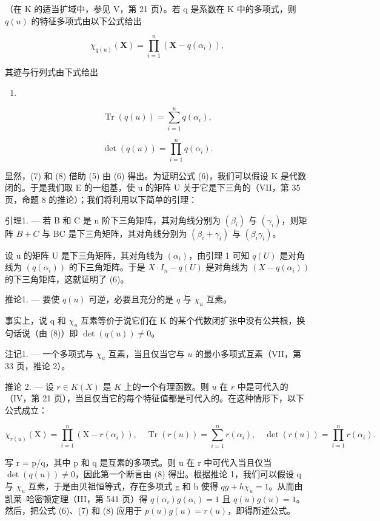 （在 K 的适当扩域中，参见 V，第 21 页）。若 q 是系数在 K 中的多项式，则 \(q(u)\) 的特征多项式由以下公式给出

\[
\chi_ {q (u)} (\mathbf {X}) = \prod_ {i = 1} ^ {n} \left(\mathbf {X} - q \left(\alpha_ {i}\right)\right),\tag{6}
\]

其迹与行列式由下式给出

\begin{enumerate}
\def\labelenumi{(\arabic{enumi})}
\setcounter{enumi}{6}
\tightlist
\item
\end{enumerate}

\[
\operatorname{Tr} (q (u)) = \sum_ {i = 1} ^ {n} q (\alpha_ {i}),\tag{8}
\]

\[
\det (q (u)) = \prod_ {i = 1} ^ {n} q (\alpha_ {i}).
\]

显然，(7) 和 (8) 借助 (5) 由 (6) 得出。为证明公式 (6)，我们可以假设 K 是代数闭的。于是我们取 E 的一组基，使 u 的矩阵 U 关于它是下三角的（VII，第 35 页，命题 8 的推论）；我们将利用以下简单的引理：

引理1. --- 若 B 和 C 是 n 阶下三角矩阵，其对角线分别为 \((\beta_{i})\) 与 \((\gamma_{i})\)，则矩阵 \(B + C\) 与 BC 是下三角矩阵，其对角线分别为 \((\beta_{i} + \gamma_{i})\) 与 \((\beta_{i}\gamma_{i})\)。

设 u 的矩阵 U 是下三角矩阵，其对角线为 \((\alpha_{i})\)，由引理 1 可知 \(q(U)\) 是对角线为 \((q(\alpha_{i}))\) 的下三角矩阵。于是 \(X \cdot I_{n} - q(U)\) 是对角线为 \((X - q(\alpha_{i}))\) 的下三角矩阵，这就证明了 (6)。

推论1. --- 要使 \(q(u)\) 可逆，必要且充分的是 \(q\) 与 \(\chi_u\) 互素。

事实上，说 q 和 \(\chi_{u}\) 互素等价于说它们在 K 的某个代数闭扩张中没有公共根，换句话说（由 (8)）即 \(\det(q(u)) \neq 0\)。

注记1. --- 一个多项式与 \(\chi_{u}\) 互素，当且仅当它与 \(u\) 的最小多项式互素（VII，第 33 页，推论 2）。

推论 2. --- 设 \(r \in K(X)\) 是 \(K\) 上的一个有理函数。则 \(u\) 在 \(r\) 中是可代入的（IV，第 21 页），当且仅当它的每个特征值都是可代入的。在这种情形下，以下公式成立：

\[
\chi_ {r (u)} (\mathrm{X}) = \prod_ {i = 1} ^ {n} \left(\mathrm{X} - r \left(\alpha_ {i}\right)\right), \quad \operatorname{Tr} (r (u)) = \sum_ {i = 1} ^ {n} r \left(\alpha_ {i}\right), \quad \det (r (u)) = \prod_ {i = 1} ^ {n} r \left(\alpha_ {i}\right).
\]

写 r = p/q，其中 p 和 q 是互素的多项式。则 u 在 r 中可代入当且仅当 \(\det(q(u)) \neq 0\)，因此第一个断言由 (8) 得出。根据推论 1，我们可以假设 q 与 \(\chi_{u}\) 互素，于是由贝祖恒等式，存在多项式 g 和 h 使得 \(qg + h\chi_{u} = 1\)。从而由凯莱–哈密顿定理（III，第 541 页）得 \(q(\alpha_{i})g(\alpha_{i}) = 1\) 且 \(q(u)g(u) = 1\)。然后，把公式 (6)、(7) 和 (8) 应用于 \(p(u)g(u) = r(u)\)，即得所述公式。

